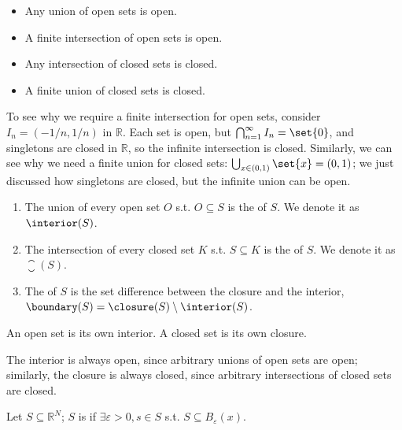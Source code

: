 \documentclass{article}
\begin{document}
\begin{claim}
\begin{itemize}[label=$\bullet$]
  \item Any union of open sets is open.

  \item A finite intersection of open sets is open.

  \item Any intersection of closed sets is closed.

  \item A finite union of closed sets is closed.
\end{itemize}
\end{claim}

To see why we require a finite intersection for open sets, consider $I_n = (-1/n, 1/n)$ in $\mathbb{R}$. Each set is open, but $\bigcap^{\infty}_{n = 1} I_n = \set{0}$, and singletons are closed in $\mathbb{R}$, so the infinite intersection is closed. Similarly, we can see why we need a finite union for closed sets: $\bigcup_{x \in (0, 1)} \set{x} = (0, 1)$; we just discussed how singletons are closed, but the infinite union can be open.
\begin{definition}\label{def:lecture1_interior_closure_boundary}
  \begin{enumerate}
    \item The union of every open set $O$ s.t. $O \subseteq S$ is the  of $S$. We denote it as $\interior(S)$.

    \item The intersection of every closed set $K$ s.t. $S \subseteq K$ is the  of $S$. We denote it as $\closure(S)$.

    \item The  of $S$ is the set difference between the closure and the interior, $\boundary(S) = \closure(S) \setminus \interior(S)$.
  \end{enumerate}
\end{definition}

\begin{claim}
  An open set is its own interior. A closed set is its own closure.
\end{claim}

The interior is always open, since arbitrary unions of open sets are open; similarly, the closure is always closed, since arbitrary intersections of closed sets are closed.

\begin{definition}
  Let $S \subseteq \mathbb{R}^N$; $S$ is  if $\exists \varepsilon > 0, s \in S$ s.t. $S \subseteq B_{\varepsilon}(x)$.
\end{definition}
\end{document}
